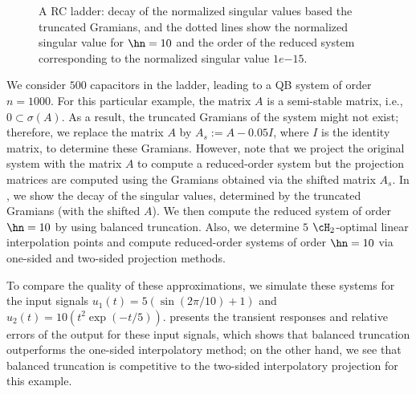 \begin{figure}[!tb]
	\centering
	\setlength\fheight{3cm}
	\setlength\fwidth{6cm}
	\caption{A RC ladder: decay of the normalized singular values based the truncated Gramians, and the dotted lines show the normalized singular value for $\hn =  10$ and the order of the reduced system corresponding to the normalized singular value  $1e{-15}$.}
	\label{fig:RC_sigma}
\end{figure}

We consider $500$ capacitors in the ladder, leading to a QB system of order $n=1000$. For this particular example, the matrix $A$ is a semi-stable matrix, i.e., $0\subset \sigma(A) $. As a result, the truncated Gramians of the system might not exist; therefore, we replace the matrix $A$ by $A_s := A {-} 0.05I$, where $I$ is the identity matrix, to determine these Gramians. However, note that we project the original system with the matrix $A$ to compute a reduced-order system  but the projection matrices are computed using the Gramians obtained via the shifted matrix $A_s$.  In , we show the decay of the  singular values, determined by the truncated Gramians (with the shifted $A$). We then compute the reduced system of order $\hn = 10$ by using balanced truncation. Also, we determine $5$ $\cH_2$-optimal linear interpolation points and compute reduced-order systems of order $\hn =  10$ via one-sided and two-sided projection methods.


To compare the quality of these approximations, we simulate these systems for the input signals $u_1(t) = 5\left(\sin(2\pi/10) +1\right)$ and $u_2(t) = 10\left( t^2\exp(-t/5)\right)$.   presents the transient responses and relative errors of the output for these input signals, which shows that balanced truncation outperforms the one-sided interpolatory method; on the other hand, we see that balanced truncation is competitive   to the two-sided interpolatory projection for this example.


